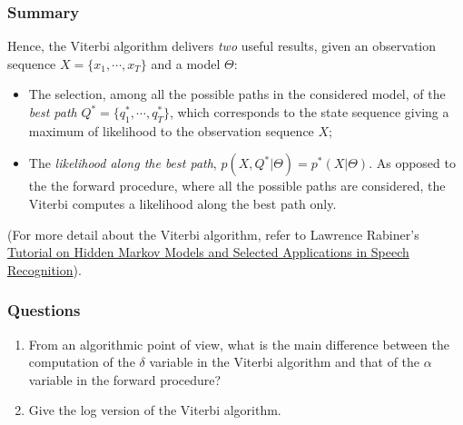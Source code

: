 \documentclass[11pt]{article}
\begin{document}
\subsubsection{Summary}
\label{sec:org92887b8}
Hence, the Viterbi algorithm delivers \emph{two} useful results, given an
observation sequence \(X=\{x_1,\cdots,x_T\}\) and a model \(\Theta\):
\begin{itemize}
\item The selection, among all the possible paths in the considered model, of the
\emph{best path} \(Q^* = \{q^*_1,\cdots,q^*_T\}\), which corresponds to the
state sequence giving a maximum of likelihood to the observation
sequence \(X\);
\item The \emph{likelihood along the best path},
\(p(X,Q^*|\Theta) = p^*(X|\Theta)\). As opposed to the the forward
procedure, where all the possible paths are considered, the Viterbi
computes a likelihood along the best path only.
\end{itemize}

(For more detail about the Viterbi algorithm, refer to Lawrence
Rabiner's \href{http://web.mit.edu/6.435/www/Rabiner89.pdf}{Tutorial on
Hidden Markov Models and Selected Applications in Speech Recognition}).

\subsubsection{Questions}
\label{sec:org85aacbe}
\begin{enumerate}
\item From an algorithmic point of view, what is the main difference
between the computation of the \(\delta\) variable in the Viterbi
algorithm and that of the \(\alpha\) variable in the forward procedure?
\item Give the log version of the Viterbi algorithm.
\end{enumerate}
\end{document}
